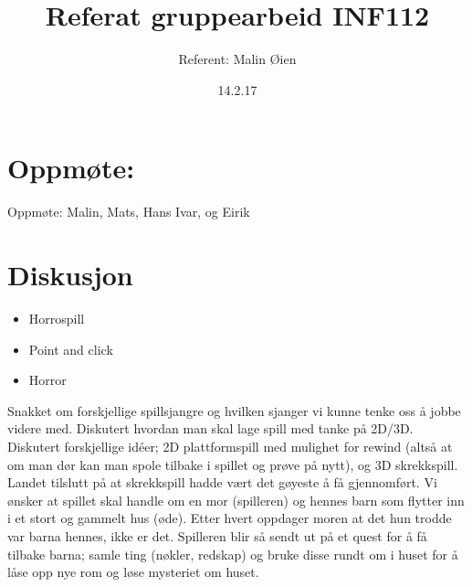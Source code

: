 \documentclass[a4paper]{article}
\begin{document}
\title{Referat gruppearbeid INF112}
\date{14.2.17}

\author{Referent: Malin Øien}
\maketitle

\section{Oppmøte:}

Oppmøte: Malin, Mats, Hans Ivar, og Eirik



\section{Diskusjon}

\begin{itemize}
\item{Horrospill}
\item{Point and click}
\item{Horror}
\end{itemize}

Snakket om forskjellige spillsjangre og hvilken sjanger vi kunne tenke oss å jobbe videre med. Diskutert hvordan man skal lage spill med tanke på 2D/3D. Diskutert forskjellige idéer; 2D plattformspill med mulighet for rewind (altså at om man dør kan man spole tilbake i spillet og prøve på nytt), og 3D skrekkspill. Landet tilslutt på at skrekkspill hadde vært det gøyeste å få gjennomført. Vi ønsker at spillet skal handle om en mor (spilleren) og hennes barn som flytter inn i et stort og gammelt hus (øde). Etter hvert oppdager moren at det hun trodde var barna hennes, ikke er det. Spilleren blir så sendt ut på et quest for å få tilbake barna; samle ting (nøkler, redskap) og bruke disse rundt om i huset for å låse opp nye rom og løse mysteriet om huset.
\end{document}
